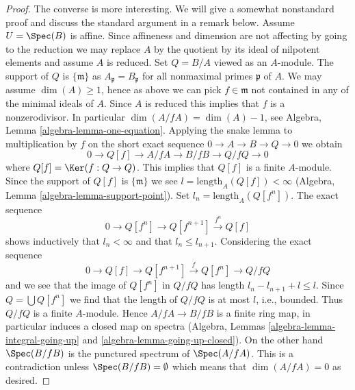\begin{proof}
\medskip\noindent
The converse is more interesting. We will give a somewhat nonstandard proof
and discuss the standard argument in a remark below.
Assume $U = \Spec(B)$ is affine. Since affineness and dimension are not
affecting by going to the reduction we may replace $A$ by the quotient by
its ideal of nilpotent elements and assume $A$ is reduced.
Set $Q = B/A$ viewed as an $A$-module.
The support of $Q$ is $\{\mathfrak m\}$ as $A_\mathfrak p = B_\mathfrak p$
for all nonmaximal primes $\mathfrak p$ of $A$.
We may assume $\dim(A) \geq 1$, hence as above we can pick
$f \in \mathfrak m$ not contained in any of the minimal ideals of $A$.
Since $A$ is reduced this implies that $f$ is a nonzerodivisor.
In particular $\dim(A/fA) = \dim(A) - 1$, see
Algebra, Lemma \ref{algebra-lemma-one-equation}.
Applying the snake lemma to multiplication by $f$ on the short
exact sequence $0 \to A \to B \to Q \to 0$ we obtain
$$
0 \to Q[f] \to A/fA \to B/fB \to Q/fQ \to 0
$$
where $Q[f] = \Ker(f : Q \to Q)$.
This implies that $Q[f]$ is a finite $A$-module. Since the support of
$Q[f]$ is $\{\mathfrak m\}$ we see $l = \text{length}_A(Q[f]) < \infty$
(Algebra, Lemma \ref{algebra-lemma-support-point}).
Set $l_n = \text{length}_A(Q[f^n])$. The exact sequence
$$
0 \to Q[f^n] \to Q[f^{n + 1}] \xrightarrow{f^n} Q[f]
$$
shows inductively that $l_n < \infty$ and that $l_n \leq l_{n + 1}$.
Considering the exact sequence
$$
0 \to Q[f] \to Q[f^{n + 1}] \xrightarrow{f} Q[f^n] \to Q/fQ
$$
and we see that the image of $Q[f^n]$ in $Q/fQ$ has length
$l_n - l_{n + 1} + l \leq l$. Since $Q = \bigcup Q[f^n]$ we
find that the length of $Q/fQ$ is at most $l$, i.e., bounded.
Thus $Q/fQ$ is a finite $A$-module. Hence $A/fA \to B/fB$ is a
finite ring map, in particular induces a closed map on spectra
(Algebra, Lemmas \ref{algebra-lemma-integral-going-up} and
\ref{algebra-lemma-going-up-closed}).
On the other hand $\Spec(B/fB)$ is the punctured spectrum of $\Spec(A/fA)$.
This is a contradiction unless $\Spec(B/fB) = \emptyset$ which
means that $\dim(A/fA) = 0$ as desired.
\end{proof}

